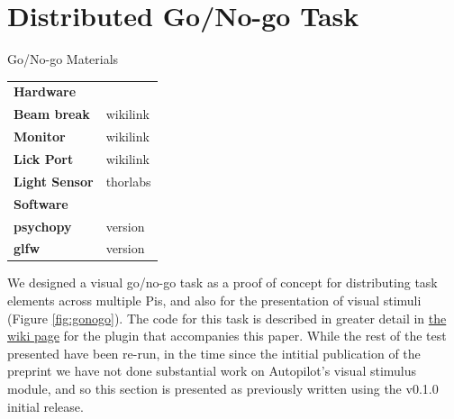 \section{Distributed Go/No-go Task}
\label{sec:gonogo}

\begin{margintable}[0cm]
\caption{Go/No-go Materials}
\label{tab:gpiomaterials}
\noindent\begin{tabularx}{\linewidth}{lX}%
\toprule
\textbf{Hardware} & \\
\textbf{Beam break} & wikilink \\
\textbf{Monitor} & wikilink \\
\textbf{Lick Port} & wikilink \\
\textbf{Light Sensor} & thorlabs \\
\midrule
\textbf{Software} & \\
\textbf{psychopy} & version \\
\textbf{glfw} & version \\
\bottomrule
\end{tabularx}
\end{margintable}

We designed a visual go/no-go task as a proof of concept for distributing task elements across multiple Pis, and also for the presentation of visual stimuli (Figure \ref{fig:gonogo}). The code for this task is described in greater detail in \href{https://wiki.auto-pi-lot.com/index.php/Plugin:Autopilot_Paper}{the wiki page} for the plugin that accompanies this paper. While the rest of the test presented have been re-run, in the time since the intitial publication of the preprint we have not done substantial work on Autopilot's visual stimulus module, and so this section is presented as previously written using the v0.1.0 initial release.


